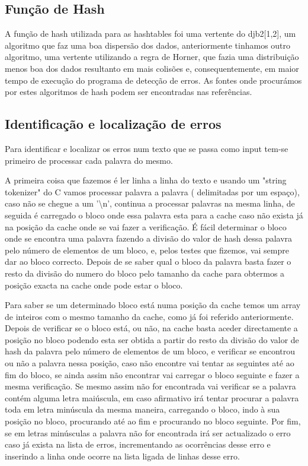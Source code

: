 \subsection{Função de Hash}

A função de hash utilizada para as hashtables foi uma vertente do djb2[1,2], um algoritmo que faz uma boa dispersão dos dados, anteriormente tinhamos outro algoritmo, uma vertente utilizando a regra de Horner, que fazia uma distribuição menos boa dos dados resultanto em mais colisões e, consequentemente, em maior tempo de execução do programa de detecção de erros. As fontes onde procurámos por estes algoritmos de hash podem ser encontradas nas referências.

\subsection{Identificação e localização de erros}

Para identificar e localizar os erros num texto que se passa como input tem-se primeiro de processar cada palavra do mesmo. 

A primeira coisa que fazemos é ler linha a linha do texto e usando um "string tokenizer" do C vamos processar palavra a palavra ( delimitadas por um espaço), caso não se chegue a um '\textbackslash n', continua a processar palavras na mesma linha, de seguida é carregado o bloco onde essa palavra esta para a cache caso não exista já na posição da cache onde se vai fazer a verificação. É fácil determinar o bloco onde se encontra uma palavra fazendo a divisão do valor de hash dessa palavra pelo número de elementos de um bloco, e, pelos testes que fizemos, vai sempre dar ao bloco correcto. Depois de se saber qual o bloco da palavra basta fazer o resto da divisão do numero do bloco pelo tamanho da cache para obtermos a posição exacta na cache onde pode estar o bloco.

Para saber se um determinado bloco está numa posição da cache temos um array de inteiros com o mesmo tamanho da cache, como já foi referido anteriormente.\\

Depois de verificar se o bloco está, ou não, na cache basta aceder directamente a posição no bloco podendo esta ser obtida a partir do resto da divisão do valor de hash da palavra pelo número de elementos de um bloco, e verificar se encontrou ou não a palavra nessa posição, caso não encontre vai tentar as seguintes até ao fim do bloco, se ainda assim não encontrar vai carregar o bloco seguinte e fazer a mesma verificação. Se mesmo assim não for encontrada vai verificar se a palavra contém alguma letra maiúscula, em caso afirmativo irá tentar procurar a palavra toda em letra minúscula da mesma maneira, carregando o bloco, indo à sua posição no bloco, procurando até ao fim e procurando no bloco seguinte. Por fim, se em letras minúsculas a palavra não for encontrada irá ser actualizado o erro caso já exista na lista de erros, incrementando as ocorrências desse erro e inserindo a linha onde ocorre na lista ligada de linhas desse erro.\\

